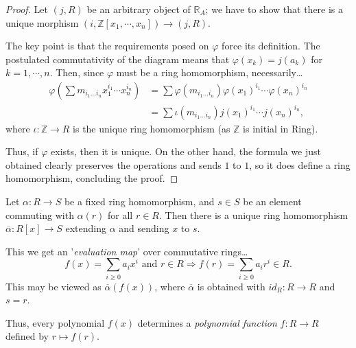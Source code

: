 \begin{proof}
Let $(j,R)$ be an arbitrary object of $\mathbb{R}_A$; we have to show that there is a unique morphism $(i, \mathbb{Z}[x_1, \cdots, x_n]) \rightarrow (j, R)$.

The key point is that the requirements posed on $\varphi$ force its definition. The postulated commutativity of the diagram means that $\varphi(x_k) = j(a_k)$
for $k = 1, \cdots, n$. Then, since $\varphi$ must be a ring homomorphism, necessarily\dots
\begin{align*}
\varphi(\sum m_{i_1\dots i_n}x_1^{i_1}\cdots x_n^{i_n}) &= \sum \varphi(m_{i_1\dots i_n})\varphi(x_1)^{i_1}\cdots \varphi(x_n)^{i_n} \\
														&= \sum \iota(m_{i_1\dots i_n})j(x_1)^{i_1}\cdots j(x_n)^{i_n},
\end{align*}
where $\iota: \mathbb{Z} \rightarrow R$ is the unique ring homomorphism (as $\mathbb{Z}$ is initial in Ring).

Thus, if $\varphi$ exists, then it is unique. On the other hand, the formula we just obtained clearly preserves the operations and sends $1$ to $1$,
so it does define a ring homomorphism, concluding the proof.
\end{proof}

\label{polynomialevaluationmap}
Let $\alpha: R \rightarrow S$ be a fixed ring homomorphism, and $s \in S$ be an element commuting with $\alpha(r)$ for all $r \in R$.
Then there is a unique ring homomorphism $\overline{\alpha}: R[x] \rightarrow S$ extending $\alpha$ and sending $x$ to $s$.\newline

\noindent This we get an '\emph{evaluation map}' over commutative rings\dots
$$f(x) = \sum_{i \geq 0} a_i x^i \textrm{ and } r \in R \Rightarrow f(r) = \sum_{i \geq 0} a_i r^i \in R.$$
This may be viewed as $\overline{\alpha}(f(x))$, where $\overline{\alpha}$ is obtained with $id_R : R \rightarrow R$ and $s = r$.\newline

\noindent Thus, every polynomial $f(x)$ determines a \emph{polynomial function}\label{polynomialfunction} $f : R \rightarrow R$ defined by $r \mapsto f(r)$.

